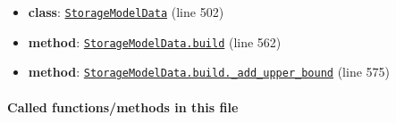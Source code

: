 \documentclass[11pt]{report}
\begin{document}
\begin{itemize}[leftmargin=*]
  \item \textbf{class}: \hyperref[def:pricetaker-design_and_operation_models.py:StorageModelData:L502]{\texttt{StorageModelData}} (line 502)
  \item \textbf{method}: \hyperref[def:pricetaker-design_and_operation_models.py:StorageModelData.build:L562]{\texttt{StorageModelData.build}} (line 562)
  \item \textbf{method}: \hyperref[def:pricetaker-design_and_operation_models.py:StorageModelData.build._add_upper_bound:L575]{\texttt{StorageModelData.build.\_add\_upper\_bound}} (line 575)
\end{itemize}
\paragraph{Called functions/methods in this file}
\end{document}

